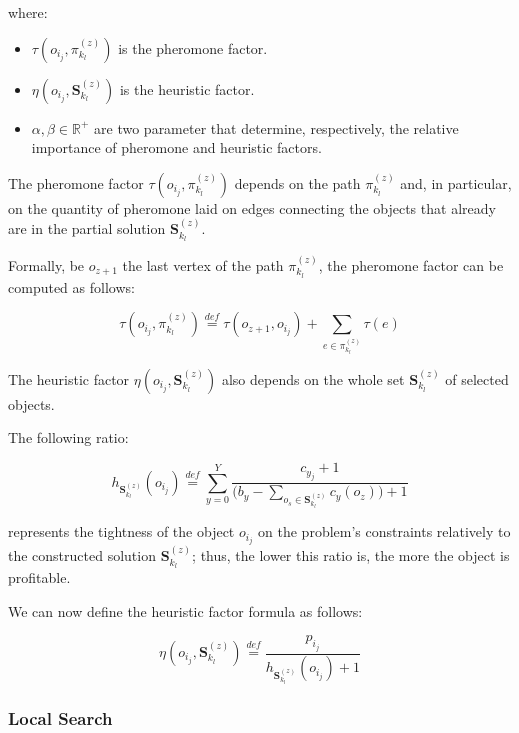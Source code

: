 \documentclass[12pt,a4paper]{report}
\newcommand{\mathDef}{\overset{\textit{def}}{=}}
\newcommand{\Rplus}{\mathbb{R}^+}
\begin{document}
where:

\begin{itemize}
	\item $\tau( o_{i_j}, \pi_{k_l}^{(z)})$ is the pheromone factor.
	\item $\eta( o_{i_j}, \textbf{S}_{k_l}^{(z)})$ is the heuristic factor.
	\item $\alpha, \beta \in \Rplus$ are two parameter that determine, respectively, the relative importance of pheromone and heuristic factors.
\end{itemize}

The pheromone factor $\tau( o_{i_j}, \pi_{k_l}^{(z)})$ depends on the path $\pi_{k_l}^{(z)}$ and, in particular, on the quantity of pheromone laid on edges connecting the objects that already are in the partial solution $\textbf{S}_{k_l}^{(z)}$.

Formally, be $o_{z+1}$ the last vertex of the path $\pi_{k_l}^{(z)}$, the pheromone factor can be computed as follows:

\begin{equation}
	\tau( o_{i_j}, \pi_{k_l}^{(z)}) \mathDef \tau(o_{z+1}, o_{i_j}) + \sum_{e \in \pi_{k_l}^{(z)}} \tau(e) 
\end{equation}

The heuristic factor $\eta( o_{i_j}, \textbf{S}_{k_l}^{(z)})$ also depends on the whole set $\textbf{S}_{k_l}^{(z)}$ of selected objects. 



The following ratio:

\begin{equation}
	h_{\textbf{S}_{k_l}^{(z)}}(o_{i_j}) \mathDef \displaystyle \sum_{y=0}^{Y} \frac{c_{y_j} + 1}{\displaystyle  \Big( b_y - \sum_{o_s \in \textbf{S}_{k_l}^{(z)}} c_y(o_z)\Big) + 1}
\end{equation}

represents the tightness of the object $o_{i_j}$ on the problem's constraints relatively to the constructed solution $\textbf{S}_{k_l}^{(z)}$; thus, the lower this ratio is, the
more the object is profitable.

We can now define the heuristic factor formula as follows:

\begin{equation}
	\eta( o_{i_j}, \textbf{S}_{k_l}^{(z)}) \mathDef \frac{p_{i_j}}{h_{\textbf{S}_{k_l}^{(z)}}(o_{i_j}) + 1}
\end{equation}


\subsubsection{Local Search}
\end{document}
